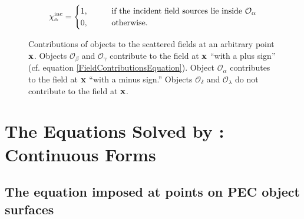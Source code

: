 \documentclass[dvips,letterpaper]{article}
\begin{document}
\begin{itemize}
        $$
         \chi^{\hbox{\scriptsize{inc}}}_\alpha
         =\begin{cases} 
            1, \qquad &\text{if the incident field sources lie inside 
                              $\mathcal{O}_\alpha$} \\
            0, \qquad &\text{otherwise.}
          \end{cases} 
        $$
        

\end{itemize}

\begin{figure}
\begin{center}
\caption{Contributions of objects to the scattered fields at 
         an arbitrary point $\mathbf{x}$. Objects $\mathcal{O}_\beta$
         and $\mathcal{O}_\gamma$ contribute
         to the field at $\mathbf{x}$ ``with a plus sign'' 
         (cf. equation \ref{FieldContributionsEquation}).
         Object $\mathcal{O}_\alpha$ 
         contributes to the field at $\mathbf{x}$ ``with a minus
         sign.'' Objects $\mathcal{O}_\delta$ and $\mathcal{O}_\lambda$
         do not contribute to the field at $\mathbf{x}$.}
\label{FieldContributionsFigure}
\end{center}
\end{figure}

\newpage
\section{The Equations Solved by \ls: Continuous Forms}

\subsection{The equation imposed at points on PEC object surfaces}
\end{document}
